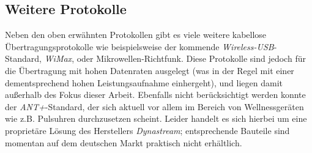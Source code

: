     \subsection{Weitere Protokolle}
        Neben den oben erwähnten Protokollen gibt es viele weitere kabellose Übertragungsprotokolle wie beispielsweise 
        der kommende \emph{Wireless-USB}-Standard, \emph{WiMax}, oder Mikrowellen-Richtfunk. Diese Protokolle sind 
        jedoch für die Übertragung mit hohen Datenraten ausgelegt (was in der Regel mit einer dementsprechend 
        hohen Leistungsaufnahme einhergeht), und liegen damit außerhalb des Fokus dieser Arbeit. Ebenfalls nicht
        berücksichtigt werden konnte der \emph{ANT+}-Standard, der sich aktuell vor allem im Bereich von Wellnessgeräten
        wie z.B. Pulsuhren durchzusetzen scheint. Leider handelt es sich hierbei um eine proprietäre Lösung des 
        Herstellers \emph{Dynastream}; entsprechende Bauteile sind momentan auf dem deutschen Markt praktisch nicht
        erhältlich.


